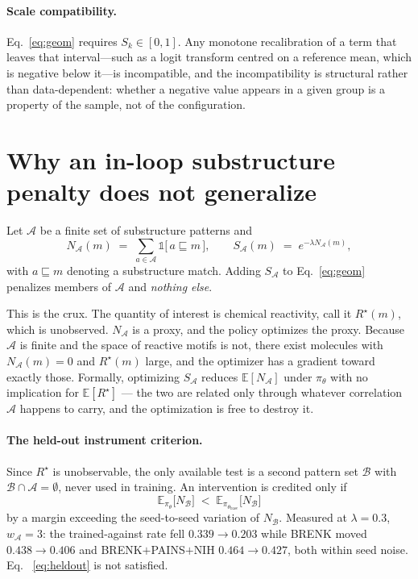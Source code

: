 \documentclass[11pt]{article}
\newcommand{\E}{\mathbb{E}}
\newcommand{\1}{\mathbb{1}}
\begin{document}
\paragraph{Scale compatibility.} Eq.~\eqref{eq:geom} requires
$S_k \in [0,1]$. Any monotone recalibration of a term that leaves that
interval---such as a logit transform centred on a reference mean, which is
negative below it---is incompatible, and the incompatibility is structural
rather than data-dependent: whether a negative value appears in a given
group is a property of the sample, not of the configuration.

\section{Why an in-loop substructure penalty does not generalize}
\label{sec:goodhart}

Let $\mathcal{A}$ be a finite set of substructure patterns and
\begin{equation}
N_{\mathcal{A}}(m) \;=\; \sum_{a \in \mathcal{A}} \1\big[\,a \sqsubseteq m\,\big],
\qquad
S_{\mathcal{A}}(m) \;=\; e^{-\lambda N_{\mathcal{A}}(m)},
\label{eq:alert}
\end{equation}
with $a \sqsubseteq m$ denoting a substructure match. Adding
$S_{\mathcal{A}}$ to Eq.~\eqref{eq:geom} penalizes members of $\mathcal{A}$
and \emph{nothing else}.

This is the crux. The quantity of interest is chemical reactivity, call it
$R^\star(m)$, which is unobserved. $N_{\mathcal{A}}$ is a proxy, and the
policy optimizes the proxy. Because $\mathcal{A}$ is finite and the space
of reactive motifs is not, there exist molecules with
$N_{\mathcal{A}}(m)=0$ and $R^\star(m)$ large, and the optimizer has a
gradient toward exactly those. Formally, optimizing $S_{\mathcal{A}}$
reduces $\E[N_{\mathcal{A}}]$ under $\pi_\theta$ with no implication for
$\E[R^\star]$ --- the two are related only through whatever correlation
$\mathcal{A}$ happens to carry, and the optimization is free to destroy it.

\paragraph{The held-out instrument criterion.} Since $R^\star$ is
unobservable, the only available test is a second pattern set
$\mathcal{B}$ with $\mathcal{B} \cap \mathcal{A} = \emptyset$, never used
in training. An intervention is credited only if
\begin{equation}
\E_{\pi_\theta}\big[N_{\mathcal{B}}\big] \;<\;
\E_{\pi_{\theta_{\mathrm{base}}}}\big[N_{\mathcal{B}}\big]
\label{eq:heldout}
\end{equation}
by a margin exceeding the seed-to-seed variation of $N_{\mathcal{B}}$.
Measured at $\lambda=0.3$, $w_{\mathcal{A}}=3$: the trained-against rate
fell $0.339 \to 0.203$ while BRENK moved $0.438 \to 0.406$ and
BRENK$+$PAINS$+$NIH $0.464 \to 0.427$, both within seed noise. Eq.~%
\eqref{eq:heldout} is not satisfied.
\end{document}
